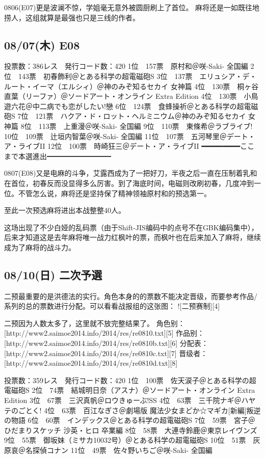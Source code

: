 0806(E07)更是波澜不惊，学姐毫无意外被圆厨刷上了首位。
麻将还是一如既往地捞人，这组就算是最强也只是三线的作者。

\subsection{08/07(木) E08}

	投票数：386レス　発行コード数：420
	1位　157票　原村和＠咲-Saki- 全国編
	2位　143票　初春飾利＠とある科学の超電磁砲S
	3位　137票　エリュシア・デ・ルート・イーマ（エルシィ）＠神のみぞ知るセカイ 女神篇
	4位　130票　桐ヶ谷直葉（リーファ）＠ソードアート・オンライン Extra Edition
	4位　130票　小鳥遊六花＠中二病でも恋がしたい!戀
	6位　124票　食蜂操祈＠とある科学の超電磁砲S
	7位　121票　ハクア・ド・ロット・ヘルミニウム＠神のみぞ知るセカイ 女神篇
	8位　113票　上重漫＠咲-Saki- 全国編
	9位　110票　東條希＠ラブライブ!
	10位　109票　辻垣内智葉＠咲-Saki- 全国編
	11位　107票　五河琴里＠デート・ア・ライブII
	12位　100票　時崎狂三＠デート・ア・ライブII
	━━━━━━━━━ここまで本選進出━━━━━━━━━

0807(E08)又是电麻的斗争，艾露西成为了一把好刀，半夜之后一直在压制着乳和在首位，初春反而没显得多么厉害。到了海底时间，电磁则改刷初春，几度冲到一位。不管怎么说，麻将还是坚持保了精神领袖原村和的预选第一。

至此一次预选麻将进出本战整整40人。

这场出现了不少白娅的乱码票（由于Shift-JIS编码中的点号不在GBK编码集中），后来才知道这是去年麻将唯一战力红枫叶的票，而枫叶也在后来加入了麻将，继续成为了麻将的战斗力。

\subsection{08/10(日) 二次予選}

二预最重要的是洪德法的实行。角色本身的的票数不能决定晋级，而要参考作品/系列的总的票数进行分配。可以看看战报组的这张图：
![二预赛制][4]

二预因为人数太多了，这里就不放完整结果了。
角色别：[http://www2.saimoe2014.info/2014/res/re0810.txt][5]
作品别：[http://www2.saimoe2014.info/2014/res/re0810b.txt][6]
分配表：[http://www2.saimoe2014.info/2014/res/re0810c.txt][7]
晋级者：[http://www2.saimoe2014.info/2014/res/re0810d.txt][8]

	投票数：359レス　発行コード数：420
	1位　100票　佐天涙子＠とある科学の超電磁砲S
	2位　74票　結城明日奈（アスナ）＠ソードアート・オンライン Extra Edition
	3位　67票　三沢真帆＠ロウきゅーぶ!SS
	4位　63票　三千院ナギ＠ハヤテのごとく!
	4位　63票　百江なぎさ＠劇場版 魔法少女まどか☆マギカ[新編]叛逆の物語
	6位　60票　インデックス＠とある科学の超電磁砲S
	7位　59票　宮子＠ひだまりスケッチ 沙英・ヒロ 卒業編
	8位　58票　大連寺鈴鹿＠東京レイヴンズ
	9位　55票　御坂妹（ミサカ10032号）＠とある科学の超電磁砲S
	10位　51票　灰原哀＠名探偵コナン
	11位　49票　佐々野いちご＠咲-Saki- 全国編

